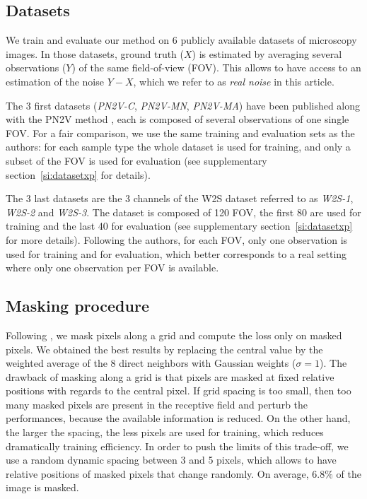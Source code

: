 \documentclass{article}
\begin{document}
\subsection{Datasets}
We train and evaluate our method on 6 publicly available datasets of microscopy images. In those datasets, ground truth ($X$) is estimated by averaging several observations ($Y$) of the same field-of-view (FOV).
This allows to have access to an estimation of the noise $Y-X$, which we refer to as \textit{real noise} in this article.

The 3 first datasets (\emph{PN2V-C}, \emph{PN2V-MN}, \emph{PN2V-MA}) have been published along with the PN2V method \cite{krull2019probabilistic}, each is composed of several observations of one single FOV.
For a fair comparison, we use the same training and evaluation sets as the authors: for each sample type the whole dataset is used for training, and only a subset of the FOV is used for evaluation (see supplementary section~\ref{si:datasetxp} for details).

The 3 last datasets are the 3 channels of the W2S dataset \cite{zhou2020w2s} referred to as \emph{W2S-1}, \emph{W2S-2} and \emph{W2S-3}.
The dataset is composed of 120 FOV, the first 80 are used for training and the last 40 for evaluation (see supplementary section~\ref{si:datasetxp} for more details).
Following the authors, for each FOV, only one observation is used for training and for evaluation, which better corresponds to a real setting where only one observation per FOV is available.

\subsection{Masking procedure}
\label{sec:masking}
Following \cite{batson2019noise2self}, we mask pixels along a grid and compute the loss only on masked pixels.
We obtained the best results by replacing the central value by the weighted average of the 8 direct neighbors with Gaussian weights ($\sigma=1$).
The drawback of masking along a grid is that pixels are masked at fixed relative positions with regards to the central pixel.
If grid spacing is too small, then too many masked pixels are present in the receptive field and perturb the performances, because the available information is reduced.
On the other hand, the larger the spacing, the less pixels are used for training, which reduces dramatically training efficiency.
In order to push the limits of this trade-off, we use a random dynamic spacing between 3 and 5 pixels, which allows to have relative positions of masked pixels that change randomly.
On average, $6.8\%$ of the image is masked.
\end{document}
